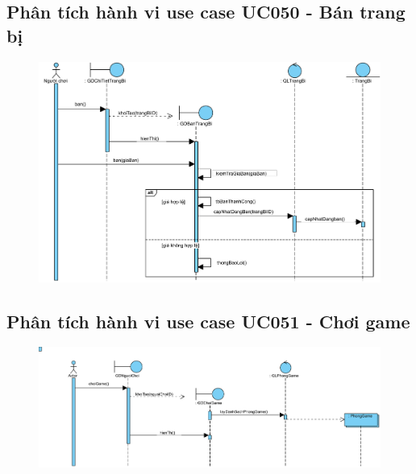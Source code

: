 \documentclass[3p]{elsarticle}
\begin{document}
\subsection{Phân tích hành vi use case UC050 - Bán trang bị}
\begin{figure}[!htbp]
	\hspace*{-.5in}
	\centering
	\includegraphics[scale=.55]{images/sequence-pdfs/gamer/ItemManagement_Sell.pdf}
\end{figure}
\subsection{Phân tích hành vi use case UC051 - Chơi game}
\begin{figure}[!htbp]
	\hspace*{-.5in}
	\centering
	\includegraphics[scale=.55]{images/sequence-pdfs/gamer/PlayGame.pdf}
\end{figure}
\newpage
\end{document}
